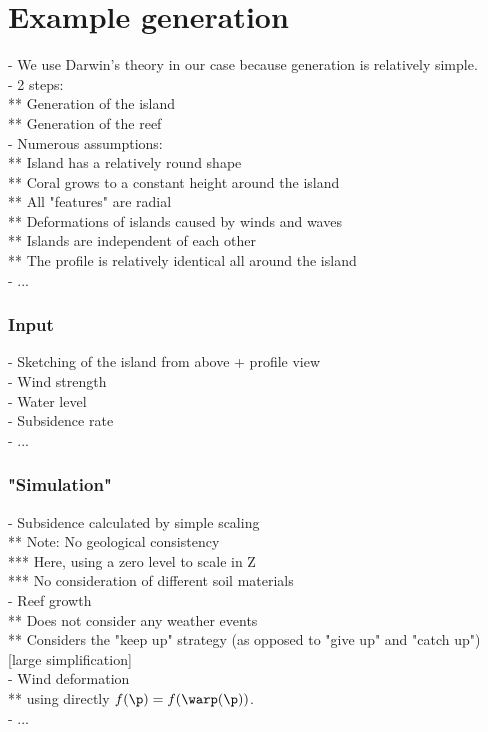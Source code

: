 \section{Example generation}
\label{sec:coral-island_example-generation}
- We use Darwin’s theory in our case because generation is relatively simple. \\
- 2 steps: \\
** Generation of the island \\
** Generation of the reef \\
- Numerous assumptions: \\
** Island has a relatively round shape \\
** Coral grows to a constant height around the island \\
** All "features" are radial \\
** Deformations of islands caused by winds and waves \\
** Islands are independent of each other \\
** The profile is relatively identical all around the island \\
- ...

\subsubsection{Input}
- Sketching of the island from above + profile view \\
- Wind strength \\
- Water level \\
- Subsidence rate \\
- ...

\subsubsection{"Simulation"}
- Subsidence calculated by simple scaling \\
** Note: No geological consistency \\
*** Here, using a zero level to scale in Z \\
*** No consideration of different soil materials \\
- Reef growth \\
** Does not consider any weather events \\
** Considers the "keep up" strategy (as opposed to "give up" and "catch up") [large simplification] \\
- Wind deformation \\
** using directly $f(\p) = f(\warp(\p))$. \\
- ...


